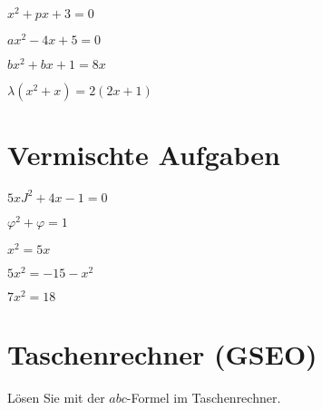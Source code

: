 \begin{bbwAufgabenBlock}
\item $ x^2 + px + 3= 0$

\item $ ax^2 - 4x + 5= 0$

\item $bx^2 + bx + 1 =8x $

\item $ \lambda (x^2+x)=2(2x+1) $


\end{bbwAufgabenBlock}
\newpage
\section{Vermischte Aufgaben}

\begin{bbwAufgabenBlock}
\item $ 5xJ^2 + 4x - 1= 0$

\item $ \varphi^2 + \varphi = 1$

\item $ x^2= 5x$

\item $ 5x^2 = -15 - x^2 $
\LoesungsBlock{$\lx= \left\{   \right\}$}

\item $ 7x^2 = 18$


\end{bbwAufgabenBlock}
\newpage

\section{Taschenrechner (GSEO)}
Lösen Sie mit der $abc$-Formel im Taschenrechner.


